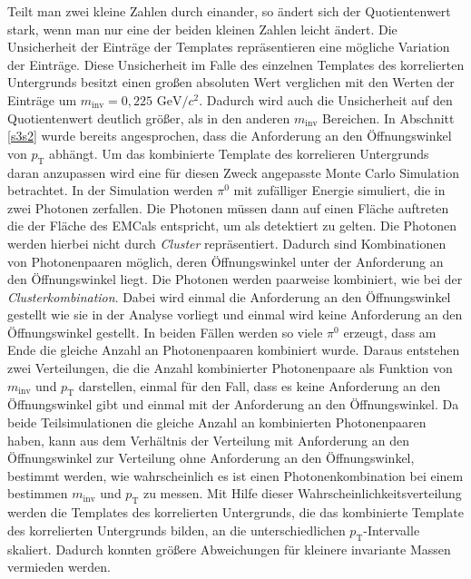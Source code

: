 Teilt man zwei kleine Zahlen durch einander, so ändert sich der Quotientenwert stark, wenn man nur eine der beiden kleinen Zahlen leicht ändert.
Die Unsicherheit der Einträge der Templates repräsentieren eine mögliche Variation der Einträge.
Diese Unsicherheit im Falle des einzelnen Templates des korrelierten Untergrunds besitzt einen großen absoluten Wert verglichen mit den Werten der Einträge um $m_\text{inv} = 0,225\text{ GeV}/c^{2}$.
Dadurch wird auch die Unsicherheit auf den Quotientenwert deutlich größer, als in den anderen $m_\text{inv}$ Bereichen.
\newline
In Abschnitt \ref{s3s2} wurde bereits angesprochen, dass die Anforderung an den Öffnungswinkel von $p_\text{T}$ abhängt.
Um das kombinierte Template des korrelieren Untergrunds daran anzupassen wird eine für diesen Zweck angepasste Monte Carlo Simulation betrachtet.
In der Simulation werden $\pi^{0}$ mit zufälliger Energie simuliert, die in zwei Photonen zerfallen.
Die Photonen müssen dann auf einen Fläche auftreten die der Fläche des EMCals entspricht, um als detektiert zu gelten.
Die Photonen werden hierbei nicht durch \textit{Cluster} repräsentiert.
Dadurch sind Kombinationen von Photonenpaaren möglich, deren Öffnungswinkel unter der Anforderung an den Öffnungswinkel liegt.
Die Photonen werden paarweise kombiniert, wie bei der \textit{Clusterkombination}.
Dabei wird einmal die Anforderung an den Öffnungswinkel gestellt wie sie in der Analyse vorliegt und einmal wird keine Anforderung an den Öffnungswinkel gestellt.
In beiden Fällen werden so viele $\pi^{0}$ erzeugt, dass am Ende die gleiche Anzahl an Photonenpaaren kombiniert wurde.
Daraus entstehen zwei Verteilungen, die die Anzahl kombinierter Photonenpaare als Funktion von $m_\text{inv}$ und $p_\text{T}$ darstellen, einmal für den Fall, dass es keine Anforderung an den Öffnungswinkel gibt und einmal mit der Anforderung an den Öffnungswinkel.
Da beide Teilsimulationen die gleiche Anzahl an kombinierten Photonenpaaren haben, kann aus dem Verhältnis der Verteilung mit Anforderung an den Öffnungswinkel zur Verteilung ohne Anforderung an den Öffnungswinkel, bestimmt werden, wie wahrscheinlich es ist einen Photonenkombination bei einem bestimmen $m_\text{inv}$ und $p_\text{T}$ zu messen.
Mit Hilfe dieser Wahrscheinlichkeitsverteilung werden die Templates des korrelierten Untergrunds, die das kombinierte Template des korrelierten Untergrunds bilden, an die unterschiedlichen $p_\text{T}$-Intervalle skaliert.
Dadurch konnten größere Abweichungen für kleinere invariante Massen vermieden werden.
\newline
